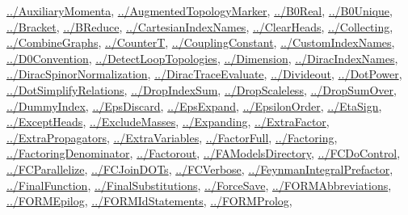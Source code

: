 \documentclass[../FeynCalcManual.tex]{subfiles}
\begin{document}
\begin{itemize}
  \hyperlink{../auxiliarymomenta}{../AuxiliaryMomenta},
  \hyperlink{../augmentedtopologymarker}{../AugmentedTopologyMarker},
  \hyperlink{../b0real}{../B0Real},
  \hyperlink{../b0unique}{../B0Unique},
  \hyperlink{../bracket}{../Bracket},
  \hyperlink{../breduce}{../BReduce},
  \hyperlink{../cartesianindexnames}{../CartesianIndexNames},
  \hyperlink{../clearheads}{../ClearHeads},
  \hyperlink{../collecting}{../Collecting},
  \hyperlink{../combinegraphs}{../CombineGraphs},
  \hyperlink{../countert}{../CounterT},
  \hyperlink{../couplingconstant}{../CouplingConstant},
  \hyperlink{../customindexnames}{../CustomIndexNames},
  \hyperlink{../d0convention}{../D0Convention},
  \hyperlink{../detectlooptopologies}{../DetectLoopTopologies},
  \hyperlink{../dimension}{../Dimension},
  \hyperlink{../diracindexnames}{../DiracIndexNames},
  \hyperlink{../diracspinornormalization}{../DiracSpinorNormalization},
  \hyperlink{../diractraceevaluate}{../DiracTraceEvaluate},
  \hyperlink{../divideout}{../Divideout},
  \hyperlink{../dotpower}{../DotPower},
  \hyperlink{../dotsimplifyrelations}{../DotSimplifyRelations},
  \hyperlink{../dropindexsum}{../DropIndexSum},
  \hyperlink{../dropscaleless}{../DropScaleless},
  \hyperlink{../dropsumover}{../DropSumOver},
  \hyperlink{../dummyindex}{../DummyIndex},
  \hyperlink{../epsdiscard}{../EpsDiscard},
  \hyperlink{../epsexpand}{../EpsExpand},
  \hyperlink{../epsilonorder}{../EpsilonOrder},
  \hyperlink{../etasign}{../EtaSign},
  \hyperlink{../exceptheads}{../ExceptHeads},
  \hyperlink{../excludemasses}{../ExcludeMasses},
  \hyperlink{../expanding}{../Expanding},
  \hyperlink{../extrafactor}{../ExtraFactor},
  \hyperlink{../extrapropagators}{../ExtraPropagators},
  \hyperlink{../extravariables}{../ExtraVariables},
  \hyperlink{../factorfull}{../FactorFull},
  \hyperlink{../factoring}{../Factoring},
  \hyperlink{../factoringdenominator}{../FactoringDenominator},
  \hyperlink{../factorout}{../Factorout},
  \hyperlink{../famodelsdirectory}{../FAModelsDirectory},
  \hyperlink{../fcdocontrol}{../FCDoControl},
  \hyperlink{../fcparallelize}{../FCParallelize},
  \hyperlink{../fcjoindots}{../FCJoinDOTs},
  \hyperlink{../fcverbose}{../FCVerbose},
  \hyperlink{../feynmanintegralprefactor}{../FeynmanIntegralPrefactor},
  \hyperlink{../finalfunction}{../FinalFunction},
  \hyperlink{../finalsubstitutions}{../FinalSubstitutions},
  \hyperlink{../forcesave}{../ForceSave},
  \hyperlink{../formabbreviations}{../FORMAbbreviations},
  \hyperlink{../formepilog}{../FORMEpilog},
  \hyperlink{../formidstatements}{../FORMIdStatements},
  \hyperlink{../formprolog}{../FORMProlog},

\end{itemize}
\end{document}
